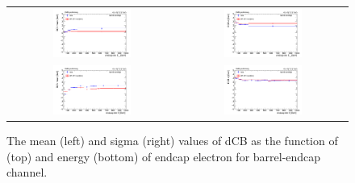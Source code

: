 \begin{figure}[ht]
  \begin{center}
    \begin{tabular}{cc}
      \includegraphics[width=0.48\textwidth]{figures/Zprime/2017/mass_resolution/scale_check/h_endcap_Et_Mee_BE_scale} &
      \includegraphics[width=0.48\textwidth]{figures/Zprime/2017/mass_resolution/scale_check/h_endcap_Et_Mee_BE_resolution} \\
      \includegraphics[width=0.48\textwidth]{figures/Zprime/2017/mass_resolution/scale_check/h_endcap_E_Mee_BE_scale} &
      \includegraphics[width=0.48\textwidth]{figures/Zprime/2017/mass_resolution/scale_check/h_endcap_E_Mee_BE_resolution}
    \end{tabular}
    \caption{The mean (left) and sigma (right) values of dCB as the function of \et (top) and energy (bottom) of endcap electron for barrel-endcap channel.
    \label{fig:data_MC_Et_E_BE}}
  \end{center}
\end{figure}


